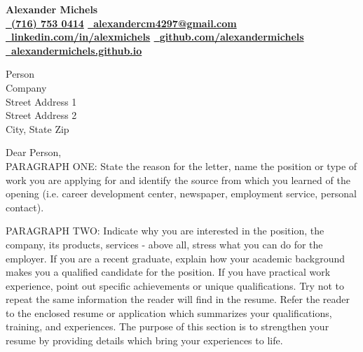 \documentclass[12pt,fleqn,notitlepage,minimal]{article} %
\begin{document}
		
		\begin{center}
			\bf {\Large Alexander Michels} \\ %
			\href{tel:+17167530414}{\faPhone \ (716) 753 0414} \hspace{.5cm} \href{mailto:alexandercm4297@gmail.com}{\textbf{\faEnvelope \ alexandercm4297@gmail.com}} \\
			\href{https://www.linkedin.com/in/alexmichels/}{\faLinkedin \ \textbf{linkedin.com/in/alexmichels}} \hspace{.5cm} \href{https://github.com/alexandermichels}{\faGithub \ \textbf{github.com/alexandermichels}} \\
			  \href{http://alexandermichels.github.io}{\faGlobeAmericas \ \textbf{alexandermichels.github.io}} \\
		\end{center} 

\begin{flushleft}
	Person \\
	Company \\
	Street Address 1 \\
	Street Address 2 \\
	City, State Zip
\end{flushleft}

\vspace{.5cm}

\noindent Dear Person, \\

PARAGRAPH ONE: State the reason for the letter, name the position or type of work you are applying for and identify the source from which you learned of the opening (i.e. career development center, newspaper, employment service, personal contact).

PARAGRAPH TWO: Indicate why you are interested in the position, the company, its products, services - above all, stress what you can do for the employer. If you are a recent graduate, explain how your academic background makes you a qualified candidate for the position. If you have practical work experience, point out specific achievements or unique qualifications. Try not to repeat the same information the reader will find in the resume. Refer the reader to the enclosed resume or application which summarizes your qualifications, training, and experiences. The purpose of this section is to strengthen your resume by providing details which bring your experiences to life. 
 
\end{document}
